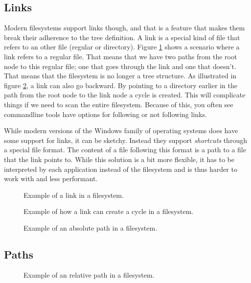 \subsection{Links}

Modern filesystems support links though, and that is a feature that makes them break their adherence to the tree definition. A link is a special kind of file that refers to an other file (regular or directory). Figure \ref{fig:bs:fs:links} shows a scenario where a link refers to a regular file. That means that we have two paths from the root node to this regular file; one that goes through the link and one that doesn't. That means that the filesystem is no longer a tree structure. As illustrated in figure \ref{fig:bs:fs:cycles}, a link can also go backward. By pointing to a directory earlier in the path from the root node to the link node a cycle is created. This will complicate things if we need to scan the entire filesystem. Because of this, you often see commandline tools have options for following or not following links.

While modern versions of the Windows family of operating systems does have some support for links, it can be sketchy. Instead they support \textsl{shortcuts} through a special  file format. The content of a file following this format is a path to a file that the link points to. While this solution is a bit more flexible, it has to be interpreted by each application instead of the filesystem and is thus harder to work with and less performant.

\begin{figure}[tbp]
  
  \caption{Example of a link in a filesystem.}
  \label{fig:bs:fs:links}
\end{figure}

\begin{figure}[tbp]
  
  \caption{Example of how a link can create a cycle in a filesystem.}
  \label{fig:bs:fs:cycles}
\end{figure}

\begin{figure}[tbp]
  
  \caption{Example of an absolute path in a filesystem.}
  \label{fig:bs:fs:path:abs}
\end{figure}

\subsection{Paths}

\begin{figure}[tbp]
  
  \caption{Example of an relative path in a filesystem.}
  \label{fig:bs:fs:path:rel}
\end{figure}

